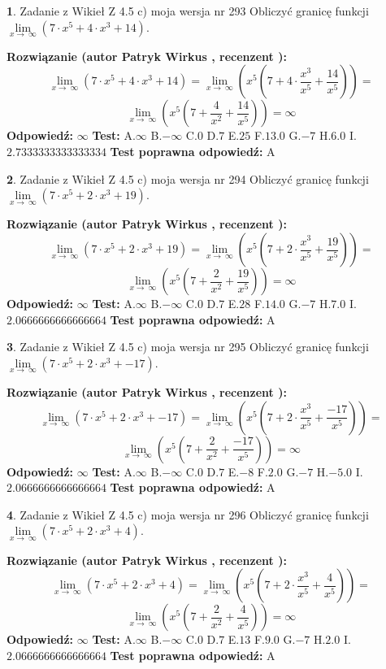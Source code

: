 \documentclass[12pt, a4paper]{article}
\theoremstyle{definition} %
\newtheorem{zad}{}
\newcommand{\zadStart}[1]{\begin{zad}#1\newline}
\newcommand{\zadStop}{\end{zad}}
\newcommand{\rozwStart}[2]{\noindent \textbf{Rozwiązanie (autor #1 , recenzent #2): }\newline}
\newcommand{\rozwStop}{\newline}
\newcommand{\odpStart}{\noindent \textbf{Odpowiedź:}\newline}
\newcommand{\odpStop}{\newline}
\newcommand{\testStart}{\noindent \textbf{Test:}\newline}
\newcommand{\testStop}{\newline}
\newcommand{\kluczStart}{\noindent \textbf{Test poprawna odpowiedź:}\newline}
\newcommand{\kluczStop}{\newline}
\begin{document}
\zadStart{Zadanie z Wikieł Z 4.5 c) moja wersja nr 293}
Obliczyć granicę funkcji  $\lim\limits_{x\to\ \infty}(7 \cdot x^{5}+4 \cdot x^{3}+14)$.
\zadStop
\rozwStart{Patryk Wirkus}{}
$$\lim\limits_{x\to\ \infty}(7 \cdot x^{5}+4 \cdot x^{3}+14) = \lim\limits_{x\to\ \infty}(x^{5}(7 +4 \cdot \frac{x^{3}}{x^{5}}+\frac{14}{x^{5}})) =$$ $$\lim\limits_{x\to\ \infty}(x^{5}(7 +\frac{4}{x^{2}}+\frac{14}{x^{5}})) =\infty$$
\rozwStop
\odpStart
$\infty$
\odpStop
\testStart
A.$\infty$ B.$-\infty$ C.$0$ D.$7$ E.$25$
F.$13.0$ G.$-7$
H.$6.0$
I.$2.7333333333333334$
\testStop
\kluczStart
A
\kluczStop



\zadStart{Zadanie z Wikieł Z 4.5 c) moja wersja nr 294}
Obliczyć granicę funkcji  $\lim\limits_{x\to\ \infty}(7 \cdot x^{5}+2 \cdot x^{3}+19)$.
\zadStop
\rozwStart{Patryk Wirkus}{}
$$\lim\limits_{x\to\ \infty}(7 \cdot x^{5}+2 \cdot x^{3}+19) = \lim\limits_{x\to\ \infty}(x^{5}(7 +2 \cdot \frac{x^{3}}{x^{5}}+\frac{19}{x^{5}})) =$$ $$\lim\limits_{x\to\ \infty}(x^{5}(7 +\frac{2}{x^{2}}+\frac{19}{x^{5}})) =\infty$$
\rozwStop
\odpStart
$\infty$
\odpStop
\testStart
A.$\infty$ B.$-\infty$ C.$0$ D.$7$ E.$28$
F.$14.0$ G.$-7$
H.$7.0$
I.$2.0666666666666664$
\testStop
\kluczStart
A
\kluczStop



\zadStart{Zadanie z Wikieł Z 4.5 c) moja wersja nr 295}
Obliczyć granicę funkcji  $\lim\limits_{x\to\ \infty}(7 \cdot x^{5}+2 \cdot x^{3}+-17)$.
\zadStop
\rozwStart{Patryk Wirkus}{}
$$\lim\limits_{x\to\ \infty}(7 \cdot x^{5}+2 \cdot x^{3}+-17) = \lim\limits_{x\to\ \infty}(x^{5}(7 +2 \cdot \frac{x^{3}}{x^{5}}+\frac{-17}{x^{5}})) =$$ $$\lim\limits_{x\to\ \infty}(x^{5}(7 +\frac{2}{x^{2}}+\frac{-17}{x^{5}})) =\infty$$
\rozwStop
\odpStart
$\infty$
\odpStop
\testStart
A.$\infty$ B.$-\infty$ C.$0$ D.$7$ E.$-8$
F.$2.0$ G.$-7$
H.$-5.0$
I.$2.0666666666666664$
\testStop
\kluczStart
A
\kluczStop



\zadStart{Zadanie z Wikieł Z 4.5 c) moja wersja nr 296}
Obliczyć granicę funkcji  $\lim\limits_{x\to\ \infty}(7 \cdot x^{5}+2 \cdot x^{3}+4)$.
\zadStop
\rozwStart{Patryk Wirkus}{}
$$\lim\limits_{x\to\ \infty}(7 \cdot x^{5}+2 \cdot x^{3}+4) = \lim\limits_{x\to\ \infty}(x^{5}(7 +2 \cdot \frac{x^{3}}{x^{5}}+\frac{4}{x^{5}})) =$$ $$\lim\limits_{x\to\ \infty}(x^{5}(7 +\frac{2}{x^{2}}+\frac{4}{x^{5}})) =\infty$$
\rozwStop
\odpStart
$\infty$
\odpStop
\testStart
A.$\infty$ B.$-\infty$ C.$0$ D.$7$ E.$13$
F.$9.0$ G.$-7$
H.$2.0$
I.$2.0666666666666664$
\testStop
\kluczStart
A
\kluczStop
\end{document}
